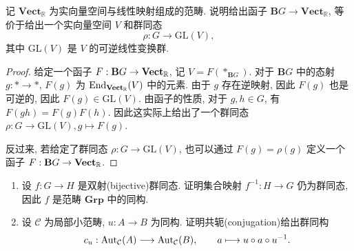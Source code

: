 \documentclass{article}
\begin{document}
\begin{problem}
  记 $\mathbf{Vect}_{\mathbb R}$ 为实向量空间与线性映射组成的范畴. 说明给出函子 $\mathbf{B}G\to\mathbf{Vect}_{\mathbb R}$, 等价于给出一个实向量空间 $V$ 和群同态
  \[
    \rho:G\to\mathrm{GL}(V),
  \]
  其中 $\mathrm{GL}(V)$ 是 $V$ 的可逆线性变换群.
\end{problem}

\begin{proof}
	给定一个函子 $F: \mathbf{B}G \to \mathbf{Vect}_{\mathbb{R}}$, 记 $V = F(*_{\mathbf{B}G})$. 对于 $\mathbf{B}G$ 中的态射 $g: * \to *$, $F(g)$ 为 $\operatorname{End}_{\mathbf{Vect}_{\mathbb{R}}}(V)$ 中的元素. 由于 $g$ 存在逆映射, 因此 $F(g)$ 也是可逆的, 因此 $F(g) \in \mathrm{GL}(V)$. 由函子的性质, 对于 $g,h \in G$, 有 $F(gh) = F(g)F(h)$. 因此这实际上给出了一个群同态 $\rho: G \to \mathrm{GL}(V), g \mapsto F(g)$.

	反过来, 若给定了群同态 $\rho: G \to \mathrm{GL}(V)$, 也可以通过 $F(g) = \rho(g)$ 定义一个函子 $F: \mathbf{B}G \to \mathbf{Vect}_{\mathbb{R}}$. 
\end{proof}



\begin{problem}
  \begin{enumerate}
    \item[(a)] 设 $f:G\to H$ 是双射(bijective)群同态. 证明集合映射 $f^{-1}:H\to G$ 仍为群同态, 因此 $f$ 是范畴 $\mathbf{Grp}$ 中的同构.
    \item[(b)] 设 $\mathcal C$ 为局部小范畴, $u:A\to B$ 为同构. 证明共轭(conjugation)给出群同构
      \[
        c_u:\operatorname{Aut}_{\mathcal C}(A)\longrightarrow\operatorname{Aut}_{\mathcal C}(B),\qquad
        a\longmapsto u\circ a\circ u^{-1}.
      \]
  \end{enumerate}
\end{problem}
\end{document}
